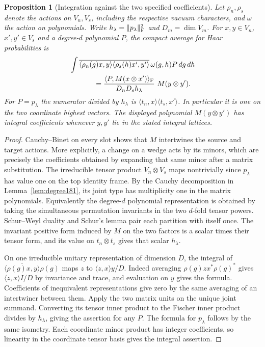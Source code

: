 \documentclass[a4paper,11pt]{article}
\newtheorem{proposition}{Proposition}[section]
\theoremstyle{definition}
\theoremstyle{remark}
\numberwithin{equation}{section}
\begin{document}
\begin{proposition}[Integration against the two specified coefficients]
\label{prop:cartan244}
Let \(\rho_n,\rho_s\) denote the actions on \(V_n,V_s\), including
the respective vacuum characters, and \(\omega\) the action on
polynomials. Write \(h_\lambda=\|p_\lambda\|_{\rm F}^2\) and
\(D_m=\dim V_m\). For \(x,y\in V_n\), \(x',y'\in V_s\) and
a degree-\(d\) polynomial \(P\), the compact average for Haar
probabilities is
\begin{align*}
 &\int\overline{\langle\rho_n(g)x,y\rangle
                 \langle\rho_s(h)x',y'\rangle}\,
                 \omega(g,h)P\,dg\,dh\\
 &\hspace{12mm}=
 \frac{\langle P,M(x\otimes x')\rangle_{\rm F}}
             {D_nD_s h_\lambda}\ M(y\otimes y').
\end{align*}
For \(P=p_\lambda\) the numerator divided by \(h_\lambda\)
is \(\langle t_n,x\rangle\langle t_s,x'\rangle\).
In particular it is one on the two coordinate highest vectors.
The displayed polynomial \(M(y\otimes y')\) has integral
coefficients whenever \(y,y'\) lie in the stated integral lattices.
\end{proposition}
\begin{proof}
Cauchy--Binet on every slot shows that \(M\) intertwines the
source and target actions. More explicitly, a change on a wedge
acts by its minors, which are precisely the coefficients obtained
by expanding that same minor after a matrix substitution. The
irreducible tensor product \(V_n\otimes V_s\) maps nontrivially
since \(p_\lambda\) has value one on the top identity frame.
By the Cauchy decomposition in Lemma~\ref{lem:degree181},
its joint type has multiplicity one in the matrix polynomials.
Equivalently the degree-\(d\) polynomial representation is obtained
by taking the simultaneous permutation invariants in the two
\(d\)-fold tensor powers. Schur--Weyl duality and Schur's lemma
pair each partition with itself once. The invariant positive form
induced by \(M\) on the two factors is a scalar times their tensor
form, and its value on \(t_n\otimes t_s\) gives that scalar
\(h_\lambda\).

On one irreducible unitary representation of dimension \(D\),
the integral of \(\overline{\langle\rho(g)x,y\rangle}\rho(g)\)
maps \(z\) to \(\langle z,x\rangle y/D\). Indeed averaging
\(\rho(g)zx^*\rho(g)^*\) gives \(\langle z,x\rangle I/D\)
by invariance and trace, and evaluation on \(y\) gives the
formula. Coefficients of inequivalent representations give zero
by the same averaging of an intertwiner between them. Apply
the two matrix units on the unique joint summand. Converting
its tensor inner product to the Fischer inner product divides
by \(h_\lambda\), giving the assertion for any \(P\). The
formula for \(p_\lambda\) follows by the same isometry. Each
coordinate minor product has integer coefficients, so linearity
in the coordinate tensor basis gives the integral assertion.
\end{proof}
\end{document}
